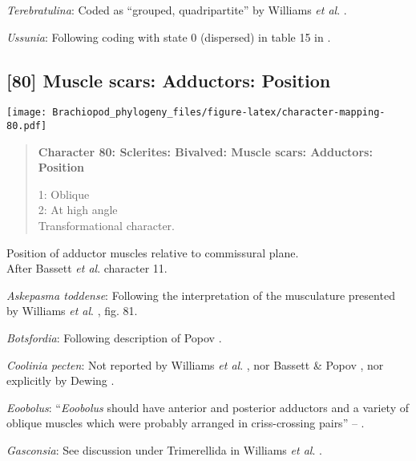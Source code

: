 \documentclass[openany]{book}
\theoremstyle{definition}
\theoremstyle{definition}
\theoremstyle{definition}
\theoremstyle{remark}
\begin{document}
\hypertarget{Terebratulina-coding-79}{}
\emph{Terebratulina}: Coded as ``grouped, quadripartite'' by Williams
\emph{et al}. \citeyearpar{Williams1996Asupra}.

\hypertarget{Ussunia-coding-79}{}
\emph{Ussunia}: Following coding with state 0 (dispersed) in table 15 in
\citet{Williams2000LinguliformeaCraniiformea}.

\subsection*{{[}80{]} Muscle scars: Adductors:
Position}\label{muscle-scars-adductors-position}

\texttt{[image: Brachiopod\_phylogeny\_files/figure-latex/character-mapping-80.pdf]}

\begin{quote}
\textbf{Character 80: Sclerites: Bivalved: Muscle scars: Adductors:
Position}

1: Oblique\\
2: At high angle\\
Transformational character.
\end{quote}

Position of adductor muscles relative to commissural plane.\\
After Bassett \emph{et al}.
\citeyearpar{Bassett2001Functionalmorphology} character 11.

\hypertarget{Askepasma_toddense-coding-80}{}
\emph{Askepasma toddense}: Following the interpretation of the
musculature presented by Williams \emph{et al}.
\citeyearpar{Williams2000LinguliformeaCraniiformea}, fig. 81.

\hypertarget{Botsfordia-coding-80}{}
\emph{Botsfordia}: Following description of Popov
\citeyearpar{Popov1992TheCambrian}.

\hypertarget{Coolinia_pecten-coding-80}{}
\emph{Coolinia pecten}: Not reported by Williams \emph{et al}.
\citeyearpar{Williams2000LinguliformeaCraniiformea}, nor Bassett \&
Popov \citeyearpar{Bassett2017Earliestontogeny}, nor explicitly by
Dewing \citeyearpar{Dewing2001Hingemodifications}.

\hypertarget{Eoobolus-coding-80}{}
\emph{Eoobolus}: ``\emph{Eoobolus} should have anterior and posterior
adductors and a variety of oblique muscles which were probably arranged
in criss-crossing pairs'' -- \citet{Balthasar2009Thebrachiopod}.

\hypertarget{Gasconsia-coding-80}{}
\emph{Gasconsia}: See discussion under Trimerellida in Williams \emph{et
al}. \citeyearpar{Williams2000LinguliformeaCraniiformea}.
\end{document}

